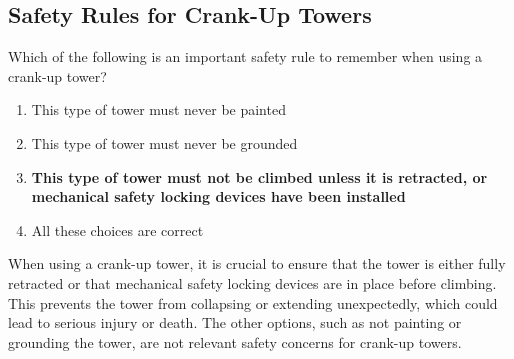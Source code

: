 \subsection{Safety Rules for Crank-Up Towers}
\label{T0B07}

\begin{tcolorbox}[colback=gray!10!white,colframe=black!75!black,title=T0B07]
Which of the following is an important safety rule to remember when using a crank-up tower?
\begin{enumerate}[noitemsep]
    \item This type of tower must never be painted
    \item This type of tower must never be grounded
    \item \textbf{This type of tower must not be climbed unless it is retracted, or mechanical safety locking devices have been installed}
    \item All these choices are correct
\end{enumerate}
\end{tcolorbox}

When using a crank-up tower, it is crucial to ensure that the tower is either fully retracted or that mechanical safety locking devices are in place before climbing. This prevents the tower from collapsing or extending unexpectedly, which could lead to serious injury or death. The other options, such as not painting or grounding the tower, are not relevant safety concerns for crank-up towers.